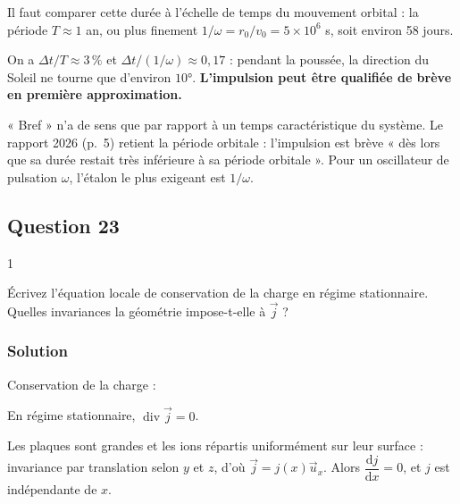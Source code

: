 \documentclass[11pt,a4paper]{article}
\newcommand{\equationajustee}[1]{%
  \sbox{\boiteequation}{$\displaystyle #1$}%
  \ifdim\wd\boiteequation>\linewidth
    \[\resizebox{\linewidth}{!}{\usebox{\boiteequation}}\]%
  \else
    \[#1\]%
  \fi}
\begin{document}
\equationajustee{\boxed{\Delta t\approx10\ \text{jours}}}

Il faut comparer cette durée à l'échelle de temps du mouvement orbital : la période \(T\approx1\) an, ou plus finement \(1/\omega=r_0/v_0=5\times10^6\) s, soit environ 58 jours.

On a \(\Delta t/T\approx3\,\%\) et \(\Delta t/(1/\omega)\approx0{,}17\) : pendant la poussée, la direction du Soleil ne tourne que d'environ \(10°\). \textbf{L'impulsion peut être qualifiée de brève en première approximation.}

\begin{methode}

« Bref » n'a de sens que par rapport à un temps caractéristique du système. Le rapport 2026 (p.~5) retient la période orbitale : l'impulsion est brève « dès lors que sa durée restait très inférieure à sa période orbitale ». Pour un oscillateur de pulsation \(\omega\), l'étalon le plus exigeant est \(1/\omega\).

\end{methode}

\hypertarget{question-23}{%
\subsection{Question 23}\label{question-23}}

\begin{indication}{1}

Écrivez l'équation locale de conservation de la charge en régime stationnaire. Quelles invariances la géométrie impose-t-elle à \(\vec j\) ?

\end{indication}

\hypertarget{solution-22}{%
\subsubsection{Solution}\label{solution-22}}

Conservation de la charge :

\equationajustee{\frac{\partial\rho}{\partial t}+\operatorname{div}\vec j=0 .}

En régime stationnaire, \(\operatorname{div}\vec j=0\).

Les plaques sont grandes et les ions répartis uniformément sur leur surface : invariance par translation selon \(y\) et \(z\), d'où \(\vec j=j(x)\vec u_x\). Alors \(\dfrac{\mathrm dj}{\mathrm dx}=0\), et \(j\) est indépendante de \(x\).
\end{document}

